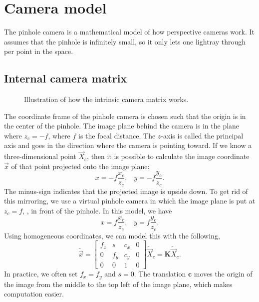 \section{Camera model} \label{sec:camera-model}

The pinhole camera is a mathematical model of how perspective cameras work.
It assumes that the pinhole is infinitely small, so it only lets one lightray
through per point in the space.

\subsection{Internal camera matrix}

\begin{figure}[ht]
    \centering
    \caption{Illustration of how the intrinsic camera matrix works.}
    \label{fig:internal-camera}
\end{figure}

The coordinate frame of the pinhole camera is chosen such that the origin is in
the center of the pinhole. The image plane behind the camera is in the plane
where $z_c=-f$, where $f$ is the focal distance. The $z$-axis is called the
principal axis and goes in the direction where the camera is pointing toward. If
we know a three-dimensional point $\vec{X}_c$, then it is possible to calculate
the image coordinate $\vec{x}$ of that point projected onto the image plane: \[
  x=-f\frac{x_c}{z_c}, \;\;\; y=-f\frac{y_c}{z_c}
.\]
The minus-sign indicates that the projected image is upside down. To get rid of
this mirroring, we use a virtual pinhole camera in which the image plane is put
at $z_c=f$, \ie, in front of the pinhole. In this model, we have \[
  x=f\frac{x_c}{z_c}, \;\;\; y=f\frac{y_c}{z_c}
.\]
Using homogeneous coordinates, we can model this with the following, \[
  \tilde{\vec{x}} = \begin{bmatrix} f_x & s & c_x & 0 \\ 0 & f_y & c_y & 0 \\ 0
  & 0 & 1 & 0 \end{bmatrix}\tilde{\vec{X}}_c = \bm{K}\tilde{\vec{X}}_c
.\]
In practice, we often set $f_x=f_y$ and $s=0$. The translation $\bm{c}$ moves
the origin of the image from the middle to the top left of the image plane,
which makes computation easier.

